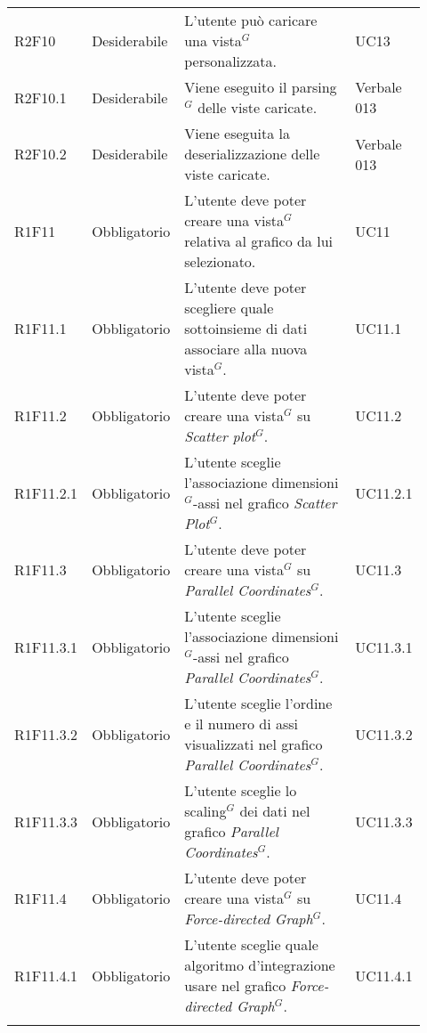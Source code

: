 {\begin{longtable}{p{0.12\linewidth}p{0.15\linewidth}p{0.50\linewidth}p{0.15\linewidth}}
    \rowcolor[RGB]{233, 245, 206}
    R2F10 & Desiderabile & L'utente può caricare una vista$^{G}$ personalizzata.  & UC13\\
    \rowcolor[RGB]{216, 235, 171}
    R2F10.1 & Desiderabile & Viene eseguito il parsing$^{G}$ delle viste caricate. & Verbale 013 \\
    \rowcolor[RGB]{233, 245, 206}
    R2F10.2 & Desiderabile & Viene eseguita la deserializzazione delle viste caricate. & Verbale 013 \\
    \rowcolor[RGB]{216, 235, 171}
    R1F11 & Obbligatorio & L'utente deve poter creare una vista$^{G}$ relativa al grafico da lui selezionato. & UC11\\ 
    \rowcolor[RGB]{233, 245, 206}
    R1F11.1 & Obbligatorio & L'utente deve poter scegliere quale sottoinsieme di dati associare alla nuova vista$^{G}$. & UC11.1\\
    \rowcolor[RGB]{216, 235, 171}
    R1F11.2 & Obbligatorio & L'utente deve poter creare una vista$^{G}$ su \textit{Scatter plot$^{G}$}. & UC11.2\\
    \rowcolor[RGB]{233, 245, 206}
    R1F11.2.1 & Obbligatorio & L'utente sceglie l'associazione dimensioni$^{G}$-assi nel grafico \textit{Scatter Plot$^{G}$}. & UC11.2.1\\
    \rowcolor[RGB]{216, 235, 171}
    R1F11.3 & Obbligatorio & L'utente deve poter creare una vista$^{G}$ su \textit{Parallel Coordinates$^{G}$}. & UC11.3\\
    \rowcolor[RGB]{233, 245, 206}
    R1F11.3.1 & Obbligatorio & L'utente sceglie l'associazione dimensioni$^{G}$-assi nel grafico \textit{Parallel Coordinates$^{G}$}. & UC11.3.1\\
    \rowcolor[RGB]{216, 235, 171}
    R1F11.3.2 & Obbligatorio & L'utente sceglie l'ordine e il numero di assi visualizzati nel grafico \textit{Parallel Coordinates$^{G}$}. &UC11.3.2\\
    \rowcolor[RGB]{233, 245, 206}
    R1F11.3.3 & Obbligatorio & L'utente sceglie lo scaling$^{G}$ dei dati nel grafico \textit{Parallel Coordinates$^{G}$}. & UC11.3.3\\
    \rowcolor[RGB]{216, 235, 171}
    R1F11.4 & Obbligatorio & L'utente deve poter creare una vista$^{G}$ su \textit{Force-directed Graph$^{G}$}. & UC11.4\\
    \rowcolor[RGB]{233, 245, 206}
    R1F11.4.1 & Obbligatorio & L'utente sceglie quale algoritmo d'integrazione usare nel grafico \textit{Force-directed Graph$^{G}$}. & UC11.4.1\\
    \rowcolor[RGB]{216, 235, 171}

\end{longtable}}
